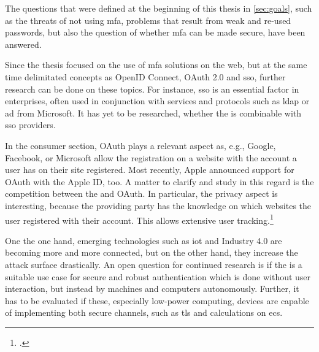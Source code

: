 The questions that were defined at the beginning of this thesis in \autoref{sec:goals}, such as the threats of not using \gls{mfa}, problems that result from weak and re-used passwords, but also the question of whether \gls{mfa} can be made secure, have been answered.

Since the thesis focused on the use of \gls{mfa} solutions on the web, but at the same time delimitated concepts as OpenID Connect, OAuth 2.0 and \gls{sso}, further research can be done on these topics. For instance, \gls{sso} is an essential factor in enterprises, often used in conjunction with services and protocols such as \gls{ldap} or \gls{ad} from Microsoft. It has yet to be researched, whether the \wa{} is combinable with \gls{sso} providers.

In the consumer section, OAuth plays a relevant aspect as, e.g., Google, Facebook, or Microsoft allow the registration on a website with the account a user has on their site registered. Most recently, Apple announced support for OAuth with the Apple ID, too. A matter to clarify and study in this regard is the competition between the \wa{} and OAuth. In particular, the privacy aspect is interesting, because the providing party has the knowledge on which websites the user registered with their account. This allows extensive user tracking.\footcites[See][18]{fido-ct-2}[See][4]{osti_1257179}

One the one hand, emerging technologies such as \gls{iot} and Industry 4.0 are becoming more and more connected, but on the other hand, they increase the attack surface drastically. An open question for continued research is if the \wa{} is a suitable use case for secure and robust authentication which is done without user interaction, but instead by machines and computers autonomously. Further, it has to be evaluated if these, especially low-power computing, devices are capable of implementing both secure channels, such as \gls{tls} and calculations on \glspl{ec}.

\newpage

